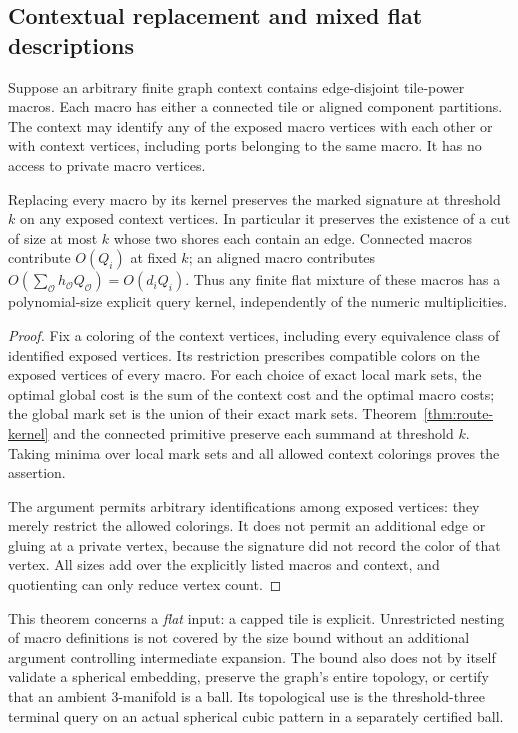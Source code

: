 \subsection{Contextual replacement and mixed flat descriptions}

\begin{theorem}
\label{thm:route-context}
Suppose an arbitrary finite graph context contains edge-disjoint tile-power
macros.  Each macro has either a connected tile or aligned component
partitions.  The context may identify any of the exposed macro vertices
with each other or with context vertices, including ports belonging to the
same macro.  It has no access to private macro vertices.

Replacing every macro by its kernel preserves the marked signature at
threshold $k$ on any exposed context vertices.  In particular it preserves
the existence of a cut of size at most $k$ whose two shores each contain an
edge.  Connected macros contribute $O(Q_i)$ at fixed $k$; an aligned macro
contributes
$O(\sum_{\mathcal O}h_{\mathcal O}Q_{\mathcal O})=O(d_iQ_i)$.
Thus any finite flat mixture of these macros has a polynomial-size explicit
query kernel, independently of the numeric multiplicities.
\end{theorem}

\begin{proof}
Fix a coloring of the context vertices, including every equivalence class
of identified exposed vertices.  Its restriction prescribes compatible
colors on the exposed vertices of every macro.  For each choice of exact
local mark sets, the optimal global cost is the sum of the context cost
and the optimal macro costs; the global mark set is the union of their
exact mark sets.  Theorem~\ref{thm:route-kernel} and the connected primitive
preserve each summand at threshold $k$.  Taking minima over local mark
sets and all allowed context colorings proves the assertion.

The argument permits arbitrary identifications among exposed vertices:
they merely restrict the allowed colorings.  It does not permit an
additional edge or gluing at a private vertex, because the signature did
not record the color of that vertex.  All sizes add over the explicitly
listed macros and context, and quotienting can only reduce vertex count.
\end{proof}

This theorem concerns a \emph{flat} input: a capped tile is explicit.
Unrestricted nesting of macro definitions is not covered by the size
bound without an additional argument controlling intermediate expansion.
The bound also does not by itself validate a spherical embedding, preserve
the graph's entire topology, or certify that an ambient 3-manifold is a
ball.  Its topological use is the threshold-three terminal query on an
actual spherical cubic pattern in a separately certified ball.

